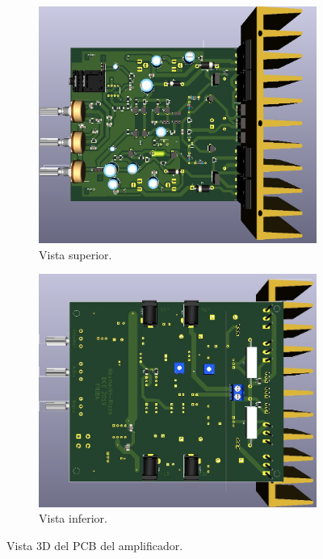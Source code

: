 \begin{figure}[H]
\centering
\begin{subfigure}{0.5\textwidth}
        \centering
        \includegraphics[width = 0.95 \textwidth]{img/circuito/PCB_3D_Top.jpeg}
        \caption{Vista superior.}
        \label{fig::PCB_3D_T}
\end{subfigure}%
\begin{subfigure}{0.5\textwidth}
        \centering
        \includegraphics[width = 0.95 \textwidth]{img/circuito/PCB_3D_Bot.jpeg}
        \caption{Vista inferior.}
        \label{fig::PCB_3D_B}
\end{subfigure}
\caption{Vista 3D del PCB del amplificador.}
\label{fig:PCB_3D}
\end{figure}

